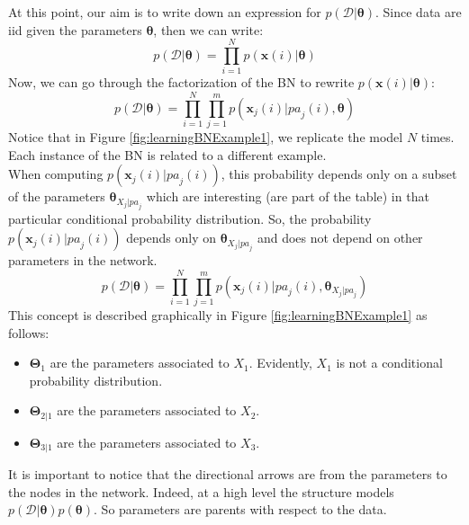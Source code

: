 At this point, our aim is to write down an expression for
$p(\mathcal{D}|\pmb{\theta})$. Since data are iid given the parameters $\pmb{\theta}$,
then we can write:
\[
	p(\mathcal{D}|\pmb{\theta}) = \prod_{i=1}^{N} p(\pmb{x}(i) | \pmb{\theta})
\]
Now, we can go through the factorization of the BN to rewrite
$p(\pmb{x}(i) | \pmb{\theta})$:
\[
	p(\mathcal{D}|\pmb{\theta}) = \prod_{i=1}^{N} \prod_{j=1}^{m} p(\pmb{x}_{j}(i)
	| \mathit{pa}_{j}(i), \pmb{\theta})
\]
Notice that in Figure \ref{fig:learningBNExample1}, we replicate the model $N$
times. Each instance of the BN is related to a different example.\\ When computing
$p(\pmb{x}_{j}(i) | \mathit{pa}_{j}(i))$, this probability depends only on a
subset of the parameters $\pmb{\theta}_{X_j | \mathit{pa}_j}$ which are
interesting (are part of the table) in that particular conditional probability
distribution. So, the probability $p(\pmb{x}_{j}(i) | \mathit{pa}_{j}(i))$
depends only on $\pmb{\theta}_{X_j | \mathit{pa}_j}$ and does not depend on
other parameters in the network.
\begin{equation}
	\label{eq:factorizationLearningBN}p(\mathcal{D}|\pmb{\theta}) = \prod_{i=1}^{N}
	\prod_{j=1}^{m} p(\pmb{x}_{j}(i) | \mathit{pa}_{j}(i), \pmb{\theta}_{X_j |
	\mathit{pa}_j})
\end{equation}
This concept is described graphically in Figure \ref{fig:learningBNExample1} as follows:
\begin{itemize}
	\item $\pmb{\Theta}_{1}$ are the parameters associated to $X_{1}$. Evidently, $X
		_{1}$ is not a conditional probability distribution.

	\item $\pmb{\Theta}_{2|1}$ are the parameters associated to $X_{2}$.

	\item $\pmb{\Theta}_{3|1}$ are the parameters associated to $X_{3}$.
\end{itemize}
It is important to notice that the directional arrows are from the parameters to
the nodes in the network. Indeed, at a high level the structure models
$p(\mathcal{D}|\pmb{\theta}) p(\pmb{\theta})$. So parameters are parents with respect
to the data.
\newline

